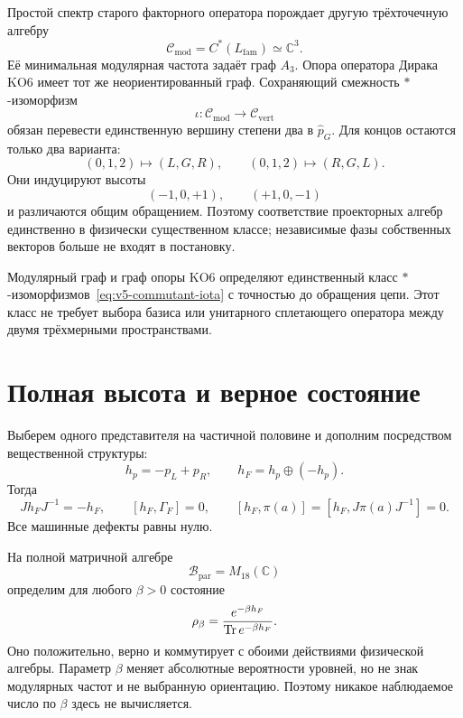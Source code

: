 Простой спектр старого факторного оператора порождает другую трёхточечную
алгебру
\begin{equation}
 \mathcal C_{\mathrm{mod}}=C^*(L_{\mathrm{fam}})\simeq\mathbb C^3.
\end{equation}
Её минимальная модулярная частота задаёт граф \(A_3\). Опора оператора
Дирака KO6 имеет тот же неориентированный граф. Сохраняющий смежность
\(*\)-изоморфизм
\begin{equation}
 \iota:\mathcal C_{\mathrm{mod}}
 \longrightarrow\mathcal C_{\mathrm{vert}}
 \label{eq:v5-commutant-iota}
\end{equation}
обязан перевести единственную вершину степени два в \(\widehat p_G\). Для концов
остаются только два варианта:
\begin{equation}
 (0,1,2)\longmapsto(L,G,R),
 \qquad
 (0,1,2)\longmapsto(R,G,L).
\end{equation}
Они индуцируют высоты
\begin{equation}
 (-1,0,+1),
 \qquad
 (+1,0,-1)
\end{equation}
и различаются общим обращением. Поэтому соответствие проекторных алгебр
единственно в физически существенном классе; независимые фазы собственных
векторов больше не входят в постановку.

\begin{theorem}
Модулярный граф и граф опоры KO6 определяют единственный класс
\(*\)-изоморфизмов~\eqref{eq:v5-commutant-iota} с точностью до обращения
цепи. Этот класс не требует выбора базиса или унитарного сплетающего
оператора между двумя трёхмерными пространствами.
\end{theorem}

\section{Полная высота и верное состояние}

Выберем одного представителя на частичной половине и дополним посредством
вещественной структуры:
\begin{equation}
 h_p=-p_L+p_R,
 \qquad
 h_F=h_p\oplus(-h_p).
\end{equation}
Тогда
\begin{equation}
 Jh_FJ^{-1}=-h_F,
 \qquad
 [h_F,\Gamma_F]=0,
 \qquad
 [h_F,\pi(a)]=[h_F,J\pi(a)J^{-1}]=0.
\end{equation}
Все машинные дефекты равны нулю.

На полной матричной алгебре
\begin{equation}
 \mathcal B_{\mathrm{par}}=M_{18}(\mathbb C)
\end{equation}
определим для любого \(\beta>0\) состояние
\begin{equation}
 \rho_\beta
 =\frac{e^{-\beta h_F}}{\operatorname{Tr} e^{-\beta h_F}}.
 \label{eq:v5-commutant-rho}
\end{equation}
Оно положительно, верно и коммутирует с обоими действиями физической
алгебры. Параметр \(\beta\) меняет абсолютные вероятности уровней, но не
знак модулярных частот и не выбранную ориентацию. Поэтому никакое
наблюдаемое число по \(\beta\) здесь не вычисляется.

